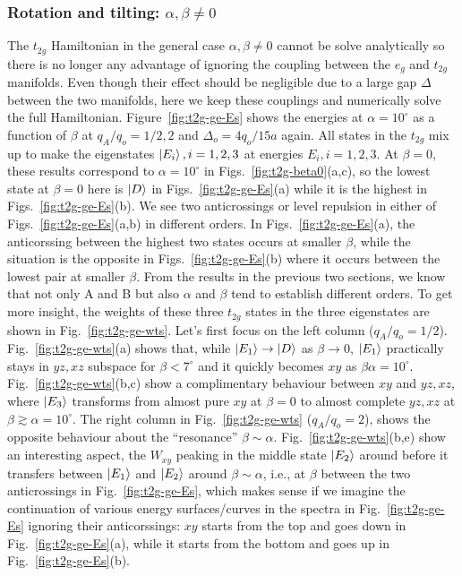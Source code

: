 \documentclass[a4paper,prb]{revtex4-1}  %
\newcommand{\az}[1]{{\color{magenta}{#1}}} %
\begin{document}
\subsubsection{Rotation and tilting: $\alpha,\beta\neq 0$}
\label{sec:t2g-gen}

The $t_{2g}$ Hamiltonian in the general case $\alpha,\beta\neq 0$ cannot be solve analytically
 so there is no longer any advantage of ignoring the coupling between 
 the $e_{g}$ and $t_{2g}$ manifolds.
Even though their effect should be negligible due to a large gap $\Delta$ between the two manifolds,
here we keep these couplings 
and numerically solve
the full Hamiltonian.
Figure~\ref{fig:t2g-ge-Es}
shows the energies at $\alpha=10^\circ$
as a function of $\beta$
at $q_A/q_o=1/2,2$ and $\Delta_o=4q_o/15a$ again.
All states in the $t_{2g}$ mix up to make the eigenstates $\ket{E_i}, i=1,2,3$
at energies $E_i, i=1,2,3$.
\az{E0, can we show E0 only in the first fig and not all of them?}
At $\beta=0$, these results correspond to $\alpha=10^\circ$ 
in Figs.~\ref{fig:t2g-beta0}(a,c),
so the lowest state at $\beta=0$
here is $\ket{D}$ in Figs.~\ref{fig:t2g-ge-Es}(a)
while it is the highest in Figs.~\ref{fig:t2g-ge-Es}(b).
We see two anticrossings or level repulsion in either of Figs.~\ref{fig:t2g-ge-Es}(a,b)
in different orders.
In Figs.~\ref{fig:t2g-ge-Es}(a), 
the anticorssing between the highest two states occurs at smaller $\beta$,
while the situation is the opposite in Figs.~\ref{fig:t2g-ge-Es}(b) where 
it occurs between the lowest pair at smaller $\beta$.
From the results in the previous two sections,
we know that not only A and B but also $\alpha$ and $\beta$ tend to establish different orders.
To get more insight, the weights of these three $t_{2g}$ states in the three eigenstates 
are shown in Fig.~\ref{fig:t2g-ge-wts}.
Let's first focus on the left column ($q_A/q_o=1/2$). 
Fig.~\ref{fig:t2g-ge-wts}(a)
shows that, while $\ket{E_1}\to \ket{D}$ as $\beta\to 0$,
$\ket{E_1}$ practically stays in $yz,xz$ subspace
for $\beta<7^\circ$ and it quickly becomes $xy$
as $\beta\alpha=10^\circ$.
Fig.~\ref{fig:t2g-ge-wts}(b,c)
show a complimentary behaviour 
between $xy$ and $yz,xz$,
where $\ket{E_3}$
transforms from almost pure $xy$ at $\beta=0$
to almost complete $yz,xz$ at $\beta\gtrsim\alpha=10^\circ$.
The right column
in Fig.~\ref{fig:t2g-ge-wts} ($q_A/q_o=2$),
shows the opposite behaviour 
about the ``resonance'' $\beta\sim\alpha$.
Fig.~\ref{fig:t2g-ge-wts}(b,e)
show an interesting aspect,
the $W_{xy}$ peaking in the middle state $\ket{E_2}$
around before it transfers between $\ket{E_1}$ and $\ket{E_2}$
around $\beta\sim\alpha$,
i.e., at $\beta$
between the two anticrossings in 
Fig.~\ref{fig:t2g-ge-Es},
which makes sense if we imagine the continuation of various energy surfaces/curves
in 
the spectra in Fig.~\ref{fig:t2g-ge-Es}
ignoring their anticorssings:
$xy$ starts from the top and goes down in 
Fig.~\ref{fig:t2g-ge-Es}(a),
while it starts from the bottom and goes up
in Fig.~\ref{fig:t2g-ge-Es}(b).
\end{document}
